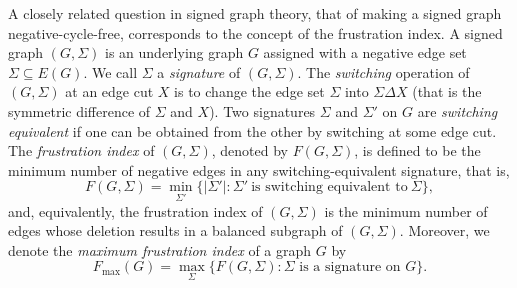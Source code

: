 \documentclass[a4paper,12pt]{article}
\theoremstyle{plain}
\theoremstyle{definition}
\theoremstyle{remark}
\numberwithin{equation}{section}
\begin{document}
A closely related question in signed graph theory, that of making a signed graph negative-cycle-free, corresponds to the concept of the frustration index. A signed graph $(G, \Sigma)$ is an underlying graph $G$ assigned with a negative edge set $\Sigma\subseteq E(G)$. We call $\Sigma$ a \emph{signature} of $(G, \Sigma)$. The \emph{switching} operation of $(G, \Sigma)$ at an edge cut $X$ is to change the edge set $\Sigma$ into $\Sigma \Delta X$ (that is the symmetric difference of $\Sigma$ and $X$). Two signatures $\Sigma$ and $\Sigma'$ on $G$ are \emph{switching equivalent} if one can be obtained from the other by switching at some edge cut. The \emph{frustration index} of $(G, \Sigma)$, denoted by $F(G, \Sigma)$, is defined to be the minimum number of negative edges in any switching-equivalent signature, that is,
$$F(G, \Sigma) = \min\limits_{\Sigma'} \{|\Sigma'|: \Sigma' ~\text{is switching equivalent to}~\Sigma\},$$ and, equivalently, the frustration index of $(G, \Sigma)$ is the minimum number of edges whose deletion results in a balanced subgraph of $(G,\Sigma)$. Moreover, we denote the \emph{maximum frustration index} of a graph $G$ by $$F_{\max}(G) = \max\limits_\Sigma \{F(G, \Sigma):  \Sigma \text{~is a signature on~}G\}.$$ 
\end{document}
